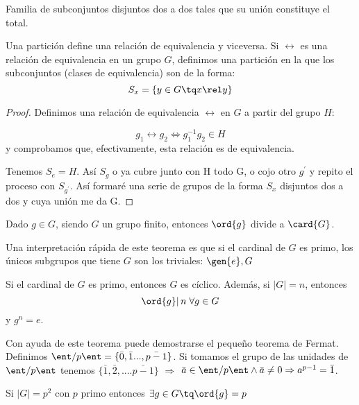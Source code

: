 \documentclass[nochap]{apuntes}
\begin{document}
  \begin{defn}[Partición]
   Familia de subconjuntos disjuntos dos a dos tales que su unión constituye el total. 
  \end{defn}
  
  Una partición define una relación de equivalencia y viceversa. Si $\rel$ es una relación de equivalencia en un grupo $G$, 
  definimos una partición en la que los subconjuntos (clases de equivalencia) son de la forma: \[ S_{x}=\{y\in G \tq x\rel y\} \]
  
  \begin{proof} Definimos una relación de equivalencia $\rel$ en $G$ a partir del grupo $H$:
  
   \[ g_{1}\rel g_{2} \Leftrightarrow g_{1}^{-1}g_{2}\in H \]  y comprobamos que, efectivamente, esta relación es de equivalencia.
   
   Tenemos $S_{e}=H$. Así $S_{g}$  o ya cubre junto con H todo G, o cojo otro $g^{'}$  y repito el proceso con $S_{g^{'}}$.
   Así formaré una serie de grupos de la forma $S_{x}$  disjuntos dos a dos y cuya unión me da G.
  \end{proof}
  
  \begin{theorem}
   Dado $g \in  G$, siendo $G$ un grupo finito, entonces $\ord{g}$ divide a $\card{G}$. 
  \end{theorem}
  
  Una interpretación rápida de este teorema es que si el cardinal de $G$ es primo, los únicos subgrupos que tiene $G$ son los triviales: $\gen{e}, G$
  
  \begin{theorem}
   Si el cardinal de $G$ es primo, entonces $G$ es cíclico. Además, si $|G|=n$, entonces \[ \ord{g} | \, n \; \forall g\in G\] y $g^n = e$.
  \end{theorem}
  
  \begin{example}
   Con ayuda de este teorema puede demostrarse el pequeño teorema de Fermat. 
   Definimos $\ent/p\ent=\{\bar{0},\bar{1}...,\bar{p-1}\}$.
   Si tomamos el grupo de las unidades de $\ent/p\ent$ tenemos $\{\bar{1}, \bar{2},....\bar{p-1}\}$ $\Rightarrow$
   $\bar{a}\in\ent/p\ent \wedge \bar{a}\neq 0 \Rightarrow a^{p-1}=\bar{1}$.
  \end{example}
  
  \begin{theorem}
   Si $|G|=p^{2}$  con $p$ primo entonces $\exists g \in G \tq \ord{g}=p$
  \end{theorem}
  
\end{document}
